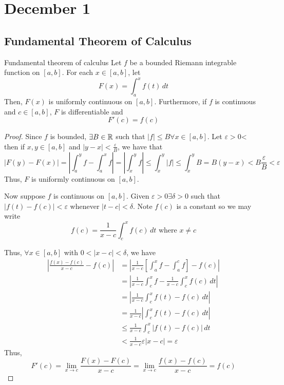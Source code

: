 \chapter{December 1}

\section{Fundamental Theorem of Calculus}
\begin{theorem}{Fundamental theorem of calculus}{}
    Let $f$ be a bounded Riemann integrable function on $[a, b]$. For each $x \in [a, b]$, let $$F(x) = \int_a^x f(t) \, dt$$ Then, $F(x)$ is uniformly continuous on $[a, b]$. Furthermore, if $f$ is continuous and $c \in [a, b]$, $F$ is differentiable and $$F'(c) = f(c)$$
\end{theorem}
\begin{proof}
    Since $f$ is bounded, $\exists B \in \mathbb{R}$ such that $|f| \leq B \forall x \in [a, b]$. Let $\varepsilon > 0$< then if $x, y \in [a, b]$ and $|y - x| < \frac{\varepsilon}{B}$, we have that $$|F(y) - F(x)| = \left|\int_a^y f - \int_a^x f\right| = \left|\int_x^y f\right| \leq \int_x^y |f| \leq \int_x^y B = B(y - x) < B \frac{\varepsilon}{B}< \varepsilon$$ Thus, $F$ is uniformly continuous on $[a, b]$.

    Now suppose $f$ is continuous on $[a, b]$. Given $\varepsilon > 0 \exists \delta > 0$ such that $|f(t) - f(c)| < \varepsilon$ whenever $|t - c| < \delta$. Note $f(c)$ is a constant so we may write $$f(c) = \frac{1}{x - c} \int_c^x f(c) \, dt \text{ where } x \neq c$$
    
    Thus, $\forall x \in [a, b]$ with $0 < |x - c| < \delta$, we have
    \begin{align*}
        \left|\frac{f(x) - f(c)}{x - c} - f(c)\right| &= \left|\frac{1}{x - c} \left[\int_a^x f - \int_a^c f\right] - f(c) \right| \\
        &= \left|\frac{1}{x - c} \int_c^x f - \frac{1}{x - c} \int_c^x f(c) \, dt\right| \\
        &= \left|\frac{1}{x - c} \int_c^x f(t) - f(c) \, dt\right| \\
        &= \frac{1}{x - c} \left|\int_c^x f(t) - f(c) \, dt\right| \\
        &\leq \frac{1}{x - c} \int_c^x |f(t) - f(c)| \, dt \\
        &< \frac{1}{x - c} \varepsilon |x - c| = \varepsilon
    \end{align*}
    Thus, $$F'(c) = \lim_{x \to c} \frac{F(x) - F(c)}{x - c} = \lim_{x \to c} \frac{f(x) - f(c)}{x - c} = f(c)$$
\end{proof}

